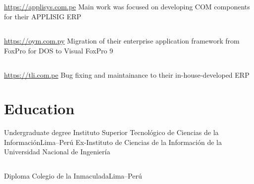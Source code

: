 \documentclass[11pt,a4paper,english]{moderncv}
\begin{document}
\subsection{}

{
\url{https://applisys.com.pe}
\newline{}
Main work was focused on developing COM components for their APPLISIG ERP
}

\subsection{}

{
\url{https://oym.com.py}
\newline{}
Migration of their enterprise application framework from FoxPro for DOS to Visual FoxPro 9
}

\subsection{}

{
\url{https://tli.com.pe}
\newline{}
Bug fixing and maintainance to their in-house-developed ERP
}

\subsection{}

\section{Education}
    {Undergraduate degree}
    {Instituto Superior Tecnológico de Ciencias de la Información}{Lima--Perú}
    {}{Ex-Instituto de Ciencias de la Información de la Universidad Nacional de Ingeniería}

\subsection{}

    {Diploma}
    {Colegio de la Inmaculada}{Lima--Perú}
    {}{}

\clearpage
    
\end{document}
